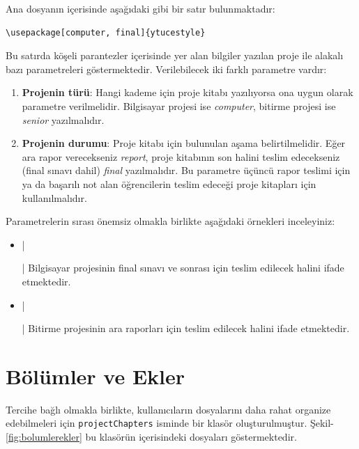Ana dosyanın içerisinde aşağıdaki gibi bir satır bulunmaktadır:

\begin{verbatim}
\usepackage[computer, final]{ytucestyle}
\end{verbatim}

Bu satırda köşeli parantezler içerisinde yer alan bilgiler yazılan proje ile alakalı bazı parametreleri göstermektedir. Verilebilecek iki farklı parametre vardır:

\begin{enumerate}
    \item \textbf{Projenin türü}: Hangi kademe için proje kitabı yazılıyorsa ona uygun olarak parametre verilmelidir. Bilgisayar projesi ise \textit{computer}, bitirme projesi ise \textit{senior} yazılmalıdır.
    
    \item \textbf{Projenin durumu}: Proje kitabı için bulunulan aşama belirtilmelidir. Eğer ara rapor verecekseniz \textit{report}, proje kitabının son halini teslim edecekseniz (final sınavı dahil) \textit{final} yazılmalıdır. Bu parametre üçüncü rapor teslimi için ya da başarılı not alan öğrencilerin teslim edeceği proje kitapları için kullanılmalıdır.
\end{enumerate}

Parametrelerin sırası önemsiz olmakla birlikte aşağıdaki örnekleri inceleyiniz:

\begin{itemize}
    \item {}|\usepackage[computer, final]{ytuthesis}| 
    Bilgisayar projesinin final sınavı ve sonrası için teslim edilecek halini ifade etmektedir.
    \item {}|\usepackage[senior, report]{ytuthesis}| 
    Bitirme projesinin ara raporları için teslim edilecek halini ifade etmektedir.
\end{itemize}

\section{Bölümler ve Ekler}
Tercihe bağlı olmakla birlikte, kullanıcıların dosyalarını daha rahat organize edebilmeleri için \texttt{projectChapters} isminde bir klasör oluşturulmuştur. Şekil-\ref{fig:bolumlerekler} bu klasörün içerisindeki dosyaları göstermektedir.

